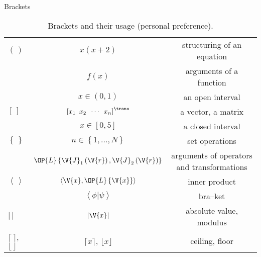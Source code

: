\documentclass[xcolor=dvipsnames, aspectratio=169, handout, intlimits]{beamer}
\begin{document}
\begin{frame}{Brackets}

\vspace{-1.25cm}
\begin{table}
\begin{center}
\caption{Brackets and their usage (personal preference).}
\begin{tabular}{lcc}
\toprule 
$\left(\,\right)$ & $x \left(x + 2 \right)$ & structuring of an equation \\ 
& $f \left(x\right)$ & arguments of a function \\
& $x \in \left(0,1\right)$ & an open interval \\ \midrule
$\left[\,\right]$ & $\left[x_1 \,\,\, x_2 \,\,\, \cdots \,\,\, x_n\right]^\trans$ & a vector, a matrix \\
 & $x \in \left[0, 5\right]$ & a closed interval \\ \midrule
$\left\{\,\right\}$ & $n \in \left\{1, \dots, N\right\}$ & set operations \\
& $\OP{L} \left\{ \V{J}_1 \left(\V{r} \right), \V{J}_2 \left(\V{r} \right)\right\}$ & arguments of operators and transformations \\ \midrule
$\left\langle\,\right\rangle$ & $\left\langle \V{x}, \OP{L} \left\{ \V{x} \right\} \right\rangle$ & inner product \\
&  $\left\langle \phi | \psi \right\rangle$ & bra--ket \\ \midrule
$|\,|$ & $| \V{x} |$ & absolute value, modulus \\ \midrule
$\lceil\,\rceil$, $\lfloor\,\rfloor$ & $\lceil x \rceil$, $\lfloor x \rfloor$ & ceiling, floor \\
\bottomrule
\end{tabular} 
\end{center}
\end{table}

\end{frame}
\end{document}
